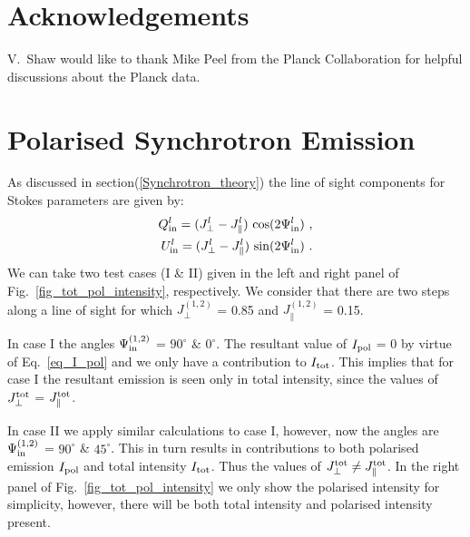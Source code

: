 \documentclass[usenatbib]{mnras}
\begin{document}
\section*{Acknowledgements}
V.~Shaw would like to thank Mike Peel from the Planck Collaboration for helpful discussions about the Planck data.




\appendix


\section{Polarised Synchrotron Emission}
\label{Appendix_A}
As discussed in section(\ref{Synchrotron_theory}) the line of sight components for Stokes parameters are given by:
\begin{eqnarray}
Q^l_{\rm in} = ({J_{\perp}^l} - J_{\parallel}^l) \ {\cos}(2\Psi^l_{\rm in}) \ ,\\ U^l_{\rm in} = ({J_{\perp}^l} - J_{\parallel}^l) \ {\sin}(2\Psi^l_{\rm in}) \ .
\end{eqnarray}
We can take two test cases (I \& II) given in the left and right panel of Fig.~\ref{fig_tot_pol_intensity}, respectively. We consider that there are two steps along a line of sight for which ${J_{\perp}^{(1,2)}}$ = 0.85 and $J_{\parallel}^{(1,2)}$  = 0.15. 

In case I the angles $\Psi_{\rm in}^{(1,2)}$ = $90^{\circ}$ \& $0^{\circ}$. The resultant value of $I_{\rm pol}$ = 0 by virtue of Eq.~\ref{eq_I_pol} and we only have a contribution to $I_{\rm tot}$. This implies that for case I the resultant emission is seen only in total intensity, since the values of $J_{\perp}^{\rm tot}$ = $J_{\parallel}^{\rm tot}$. 

In case II we apply similar calculations to case I, however, now the angles are $\Psi_{\rm in}^{(1,2)}$ = $90^{\circ}$ \& $45^{\circ}$. This in turn results in contributions to both polarised emission $I_{\rm pol}$ and total intensity $I_{\rm tot}$. Thus the values of $J_{\perp}^{\rm tot} \neq J_{\parallel}^{\rm tot}$. In the right panel of Fig.~\ref{fig_tot_pol_intensity} we only show the polarised intensity for simplicity, however, there will be both total intensity and polarised intensity present.
\end{document}

